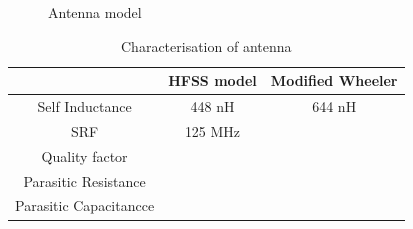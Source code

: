 \documentclass[12pt,a4paper,UKenglish]{article}
\begin{document}
\begin{figure} [!htbp]
  \centering 
\hfill
 \caption{Antenna model} 
\label{fig:ant_single} 
\end{figure}


\begin{table}[!htbp]
\caption{Characterisation of antenna} 
\begin{center}
\begin{tabular}{c|c|c}
\hline \hline
			& HFSS model 			& Modified Wheeler \cite{ant_inductance_calculation}  \\ \hline \hline
Self Inductance	  	& 448 \si{\nano\henry} 		& 644 \si{\nano\henry} \\ \hline
SRF		  	& 125 MHz			& 			\\ \hline
Quality factor		& 				&			\\ \hline
Parasitic Resistance	&				&			\\ \hline
Parasitic Capacitancce  &				&			\\
	  
\hline \hline
\end{tabular}
\end{center}
\label{tab:ant_inductance_compare}
\end{table}%
\end{document}
